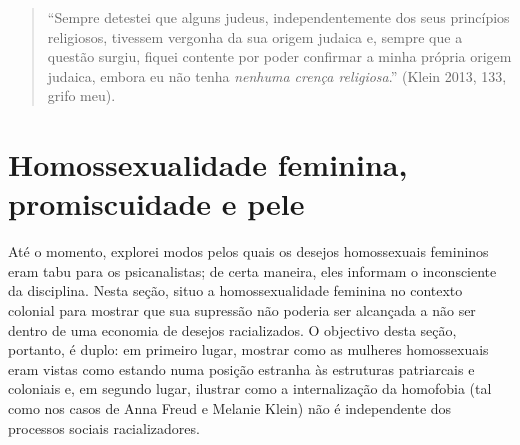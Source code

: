 \begin{quote}
``Sempre detestei que alguns judeus, independentemente dos seus
princípios religiosos, tivessem vergonha da sua origem judaica e, sempre
que a questão surgiu, fiquei contente por poder confirmar a minha
própria origem judaica, embora eu não tenha \emph{nenhuma crença
religiosa}.'' (Klein 2013, 133, grifo meu).
\end{quote}

\section{Homossexualidade feminina, promiscuidade e pele}

Até o momento, explorei modos pelos quais os desejos homossexuais
femininos eram tabu para os psicanalistas; de certa maneira, eles
informam o inconsciente da disciplina. Nesta seção, situo a
homossexualidade feminina no contexto colonial para mostrar que sua
supressão não poderia ser alcançada a não ser dentro de uma economia de
desejos racializados. O objectivo desta seção, portanto, é duplo: em
primeiro lugar, mostrar como as mulheres homossexuais eram vistas como
estando numa posição estranha às estruturas patriarcais e coloniais e,
em segundo lugar, ilustrar como a internalização da homofobia (tal como
nos casos de Anna Freud e Melanie Klein) não é independente dos
processos sociais racializadores.

